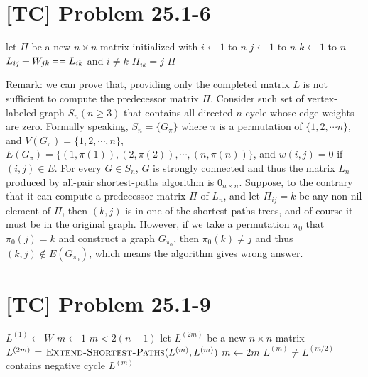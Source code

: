 \documentclass[a4paper,11pt,twocolumn]{article}
\newcommand{\NIL}{\const{nil}}
\begin{document}
  \section{[TC] Problem 25.1-6}
  \begin{codebox}
    \li let $\Pi$ be a new $n \times n$ matrix initialized with \NIL
    \li \For $i \gets 1$ to $n$
    \li \Do  \For $j \gets 1$ to $n$
    \li      \Do  \For $k \gets 1$ to $n$
    \li           \Do  \If $L_{ij}+ W_{jk} \isequal L_{ik}$ and $i \neq k$
    \li                \Do $\Pi_{ik} = j$
                       \End
                  \End
             \End
        \End
    \li \Return $\Pi$
  \end{codebox}
  Remark: we can prove that, providing only the completed matrix $L$ is not sufficient to compute the predecessor matrix $\Pi$. Consider such set of vertex-labeled graph $S_n (n \geq 3)$ that contains all directed $n$-cycle whose edge weights are zero. Formally speaking, $S_n = \{G_{\pi}\}$ where $\pi$ is a permutation of $\{1, 2, \cdots n\}$, and $V(G_{\pi}) = \{1, 2, \cdots, n\}$, $E(G_{\pi}) = \{(1, \pi(1)), (2, \pi(2)), \cdots , (n, \pi(n))\}$, and $w(i, j) = 0$ if $(i, j) \in E$. For every $G \in S_n$, $G$ is strongly connected and thus the matrix $L_n$ produced by all-pair shortest-paths algorithm is $0_{n \times n}$. Suppose, to the contrary that it can compute a predecessor matrix $\Pi$ of $L_n$, and let $\Pi_{ij} = k$ be any non-nil element of $\Pi$, then $(k, j)$ is in one of the shortest-paths trees, and of course it must be in the original graph. However, if we take a permutation $\pi_0$ that $\pi_0(j) = k$ and construct a graph $G_{\pi_0}$, then $\pi_0(k) \neq j$ and thus $(k, j) \notin E(G_{\pi_0})$, which means the algorithm gives wrong answer.

  \section{[TC] Problem 25.1-9}
  \begin{codebox}
    \li $L^{(1)} \gets W$
    \li $m \gets 1$
    \li \While $m < 2(n-1)$
    \li \Do let $L^{(2m)}$ be a new $n \times n$ matrix
    \li     $L^{(2m)} \mathrel{\hspace{1pt}=\hspace{1pt}}  \textnormal{\scshape Extend-Shortest-Paths}(L^{(m)}, L^{(m)})$
    \li     $m \gets 2m$
        \End
    \li \If $L^{(m)} \neq L^{(m/2)}$
    \li \Do \Error contains negative cycle
        \End
    \li \Return $L^{(m)}$
  \end{codebox}
\end{document}
